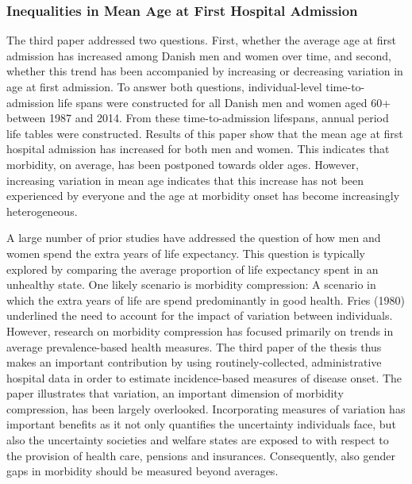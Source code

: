 
\subsubsection*{Inequalities in Mean Age at First Hospital Admission}

The third paper addressed two questions. First, whether the average 
age at first admission has increased among Danish men and women over 
time, and second, whether this trend has been accompanied by increasing 
or decreasing variation in age at first admission. To answer both questions, 
individual-level time-to-admission life spans were constructed for all 
Danish men and women aged 60+ between 1987 and 2014. From these time-to-admission 
lifespans, annual period life tables were constructed. Results of this 
paper show that the mean age at first hospital admission has increased 
for both men and women. This indicates that morbidity, on average, has 
been postponed towards older ages. However, increasing variation in mean 
age indicates that this increase has not been experienced by everyone and 
the age at morbidity onset has become increasingly heterogeneous.

A large number of prior studies have addressed the question of how men 
and women spend the extra years of life expectancy. This question is 
typically explored by comparing the average proportion of life expectancy 
spent in an unhealthy state.\citep{robine1991healthy,robine1998examination,
robine1999health,murray2012disability,salomon2012healthy,beltran2015past,
crimmins2016trends} One likely scenario is morbidity compression: A 
scenario in which the extra years of life are spend predominantly in good 
health.\citep{fries1980aging,fries2011compression,stallard2016compression} 
Fries (1980) underlined the need to account for the impact of variation 
between individuals.\citep{fries1980aging} However, research on morbidity 
compression has focused primarily on trends in average prevalence-based 
health measures.\citep{beltran2015past} The third paper of the thesis thus 
makes an important contribution by using routinely-collected, 
administrative hospital data in order to estimate incidence-based measures 
of disease onset. The paper illustrates that variation, an important dimension 
of morbidity compression, has been largely overlooked. Incorporating 
measures of variation has important benefits as it not only quantifies the 
uncertainty individuals face, but also the uncertainty societies and welfare 
states are exposed to with respect to the provision of health care, pensions 
and insurances.\citep{van2018case} Consequently, also gender gaps in morbidity 
should be measured beyond averages.

